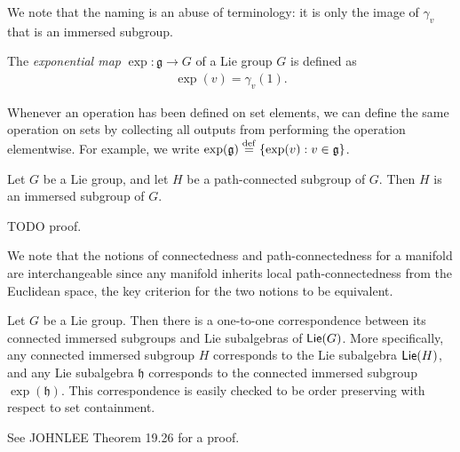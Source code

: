 \documentclass[12pt,class=article,crop=false]{standalone}
\begin{document}
We note that the naming is an abuse of terminology: it is only the image of $ \gamma_v$ that is an immersed subgroup.
\begin{defn}
	The \emph{exponential map} $ \exp: \mathfrak{g} \to G $ of a Lie group $ G$ is defined as
	\begin{align*}
		\exp(v) = \gamma_v(1) .
	\end{align*}
\end{defn}
Whenever an operation has been defined on set elements, we can define the same operation on sets by collecting all outputs from performing the operation elementwise. For example, we write $ \exp( \mathfrak{g} ) \stackrel{\mathrm{def}}{=}  \{ \exp( v): v \in \mathfrak{g} \}$.
\begin{theorem} \label{thm:subgroup}
Let $ G$ be a Lie group, and let  $ H$ be a path-connected subgroup of  $ G$. Then  $ H$ is an immersed subgroup of  $ G$.
\end{theorem}
TODO proof.

We note that the notions of connectedness and path-connectedness for a manifold are interchangeable since any manifold inherits local path-connectedness from the Euclidean space, the key criterion for the two notions to be equivalent.

\begin{fact} \label{ fact:sub_correspond} 
Let $ G$ be a Lie group. Then there is a one-to-one correspondence between its connected immersed subgroups and Lie subalgebras of $ \mathsf{Lie}( G)$. More specifically, any connected immersed subgroup $ H$ corresponds to the Lie subalgebra  $ \mathsf{Lie}( H)$, and any Lie subalgebra $ \mathfrak{h} $ corresponds to the connected immersed subgroup $ \exp( \mathfrak{h} )$. This correspondence is easily checked to be order preserving with respect to set containment.
\end{fact}
See JOHNLEE \cite{TODO} Theorem 19.26 for a proof.
\end{document}
